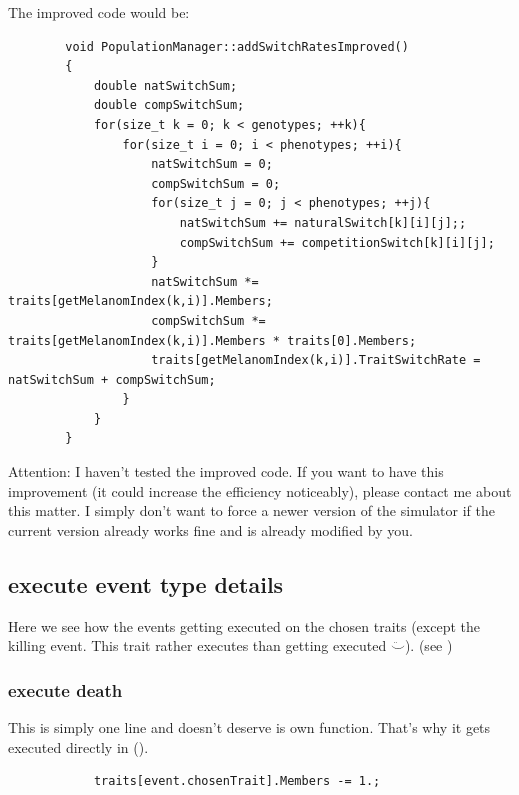 \documentclass[a4paper,10pt]{scrartcl}
\begin{document}
		The improved code would be:
		\begin{lstlisting}
		void PopulationManager::addSwitchRatesImproved()
		{
		    double natSwitchSum;
		    double compSwitchSum;
		    for(size_t k = 0; k < genotypes; ++k){
		        for(size_t i = 0; i < phenotypes; ++i){
		            natSwitchSum = 0;
		            compSwitchSum = 0;
		            for(size_t j = 0; j < phenotypes; ++j){
		                natSwitchSum += naturalSwitch[k][i][j];;
		                compSwitchSum += competitionSwitch[k][i][j];
		            }
		            natSwitchSum *= traits[getMelanomIndex(k,i)].Members;
		            compSwitchSum *= traits[getMelanomIndex(k,i)].Members * traits[0].Members;
		            traits[getMelanomIndex(k,i)].TraitSwitchRate = natSwitchSum + compSwitchSum;
		        }
		    }
		}
		\end{lstlisting}
		Attention: I haven't tested the improved code. If you want to have this improvement (it could increase the efficiency noticeably), please contact me about this matter. I simply don't want to force a newer version of the simulator if the current version already works fine and is already modified by you.
	
	\subsection{execute event type details}
	Here we see how the events getting executed on the chosen traits (except the killing event. This trait rather executes than getting executed $\ddot\smile$). (see )
		\subsubsection*{execute death}
		This is simply one line and doesn't deserve is own function. That's why it gets executed directly in ().
		\begin{lstlisting}
			traits[event.chosenTrait].Members -= 1.;
		\end{lstlisting}
\end{document}
